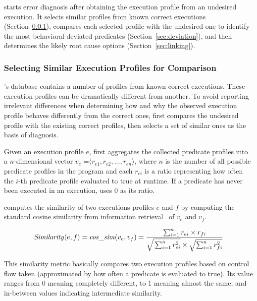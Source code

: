 \ourtool starts error diagnosis after obtaining the execution profile from
an undesired execution. It selects similar
profiles from known correct executions (Section~\ref{sec:similar}), compares
each selected profile with
the undesired one to identify the most behavioral-deviated predicates
(Section~\ref{sec:deviation}), and then determines
the likely root cause options (Section~\ref{sec:linking}).


\subsubsection{Selecting Similar Execution Profiles for Comparison}
\label{sec:similar}

\ourtool's database contains a number of
profiles from known correct executions.  These execution profiles 
can be dramatically different from another.  To avoid reporting irrelevant
differences when 
determining how and why the observed execution profile behaves
differently from the correct ones, \ourtool first
compares the undesired profile with the existing
correct profiles, then selects a set of similar ones
as the basis of diagnosis.

Given an execution profile $e$, \ourtool first aggregates
the collected predicate profiles into a $n$-dimensional
vector $v_e$ =$\langle r_{e1}, r_{e2}, ..., r_{en}\rangle$, where $n$
is the number of all possible predicate profiles in the program
and each $r_{ei}$ is a ratio representing how often the $i$-th predicate
profile evaluated to true at runtime.
If a predicate has never been executed in an execution,
\ourtool uses 0 as its ratio. 

\ourtool computes the similarity of two executions profiles $e$ and $f$
by computing the standard cosine similarity from information retrieval~\cite{Witten96managinggigabytes}
of $v_{e}$ and $v_{f}$.

\vspace{-3mm}

{\small{
\[
\|Similarity|(e, f) = \|cos\_sim|(v_{e}, v_{f}) = \frac{\sum_{i = 1}^{n}r_{ei} \times r_{fi}}
{\sqrt{\strut \sum_{i = 1}^{n}r_{ei}^2} \times \sqrt{\sum_{i = 1}^{n}r_{fi}^2}}
\]
}}

\vspace{-3mm}

This similarity metric basically compares two execution profiles based on
 control flow taken (approximated by how often a predicate is evaluated to
true). Its value ranges from 0 meaning completely different, to 1 meaning almost the same, 
and in-between values indicating intermediate similarity.


